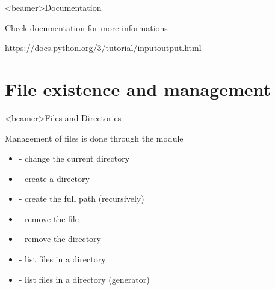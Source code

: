
\begin{frame}<beamer>{Documentation}

  \begin{center}
     Check documentation for more informations

    \bigskip

     \url{https://docs.python.org/3/tutorial/inputoutput.html}
  \end{center}

\end{frame}




\section{File existence and management}

\begin{frame}<beamer>{Files and Directories}

  Management of files is done through the  module

  \begin{itemize}
    \item<2->  - change the current directory
    \item<3->  - create a directory
    \item<4->  - create the full path (recursively)
    \item<5->  - remove the file
    \item<6->  - remove the directory
    \item<7->  - list files in a directory
    \item<8->  - list files in a directory (generator)
  \end{itemize}

\end{frame}


